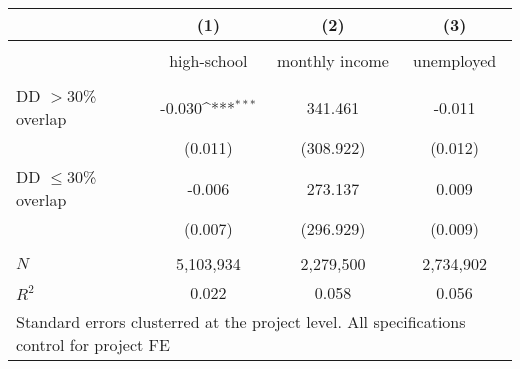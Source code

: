 {
\def\sym#1{\ifmmode^{#1}\else\(^{#1}\)\fi}
\begin{tabular}{l*{3}{c}}
 & (1) & (2) & (3)  \\[0.2em]
\hline\\[-0.9em]

                           &   high-school    &   monthly income     &   unemployed  \\
[0.2em]\hline \\[-0.9em]

DD $>$30\% overlap         &  -0.030\sym{***} &  341.461         &   -0.011         \\
                           &  (0.011)         &  (308.922)       &  (0.012)         \\
[0.5em]
DD $\leq$30\% overlap      &    -0.006        &  273.137         &    0.009         \\
                           &  (0.007)         & (296.929)        &  (0.009)         \\
\hline \\[-0.9em]    
\(N\)                      &  5,103,934       &  2,279,500       &  2,734,902       \\
\(R^{2}\)                  &    0.022         &    0.058         &    0.056         \\
\hline
\multicolumn{4}{l}{\tiny Standard errors clusterred at the project level. All specifications control for project FE}
\end{tabular}
}
